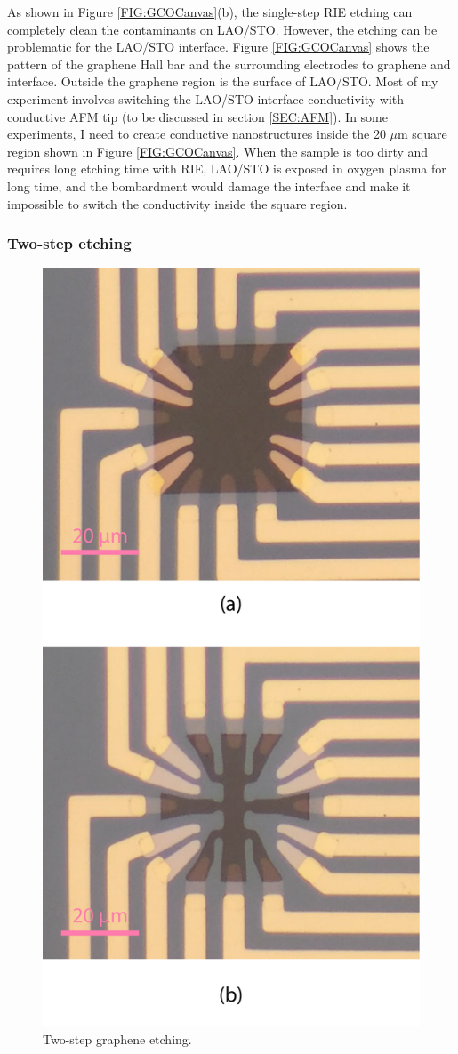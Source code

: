 \documentclass[pdflatex, sectionletters, 12pt]{pittetd}    %
\begin{document}
As shown in Figure \ref{FIG:GCOCanvas}(b), the single-step RIE etching can completely clean the contaminants on LAO/STO. However, the etching can be problematic for the LAO/STO interface. Figure \ref{FIG:GCOCanvas} shows the pattern of the graphene Hall bar and the surrounding electrodes to graphene and interface. Outside the graphene region is the surface of LAO/STO. Most of my experiment involves switching the LAO/STO interface conductivity with conductive AFM tip (to be discussed in section \ref{SEC:AFM}). In some experiments, I need to create conductive nanostructures inside the 20 $\mu$m square region shown in Figure \ref{FIG:GCOCanvas}. When the sample is too dirty and requires long etching time with RIE, LAO/STO is exposed in oxygen plasma for long time, and the bombardment would damage the interface and make it impossible to switch the conductivity inside the square region. 

\subsubsection{Two-step etching}

\begin{figure}[p]
	\centering
	\includegraphics[width=.55\textwidth]{Drawing/RIETwoStep.pdf}
	\caption{Two-step graphene etching.}
	\label{FIG:RIETwoStep}
\end{figure}
\end{document}
